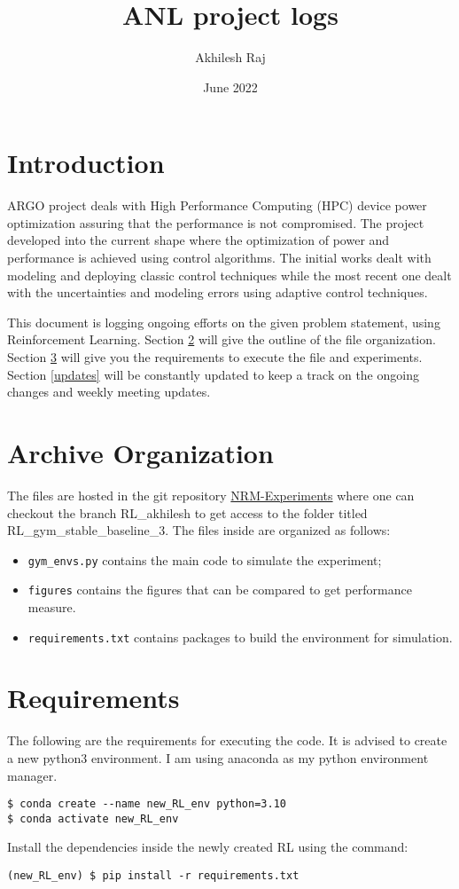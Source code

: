 \documentclass{article}
\title{ANL project logs}
\author{Akhilesh Raj}
\date{June 2022}
\begin{document}
\maketitle

\section{Introduction}
ARGO project deals with High Performance Computing (HPC) device power optimization assuring that the performance is not compromised. The project developed into the current shape where the optimization of power and performance is achieved using control algorithms. The initial works \cite{cerf2021sustaining} dealt with modeling and deploying classic control techniques while the most recent one dealt with the uncertainties and modeling errors using adaptive control techniques.

This document is logging ongoing efforts on the given problem statement, using Reinforcement Learning. Section \ref{organization} will give the outline of the file organization. Section \ref{requirements} will give you the requirements to execute the file and experiments. Section \ref{updates} will be constantly updated to keep a track on the ongoing changes and weekly meeting updates.

\section{Archive Organization} \label{organization}
The files are hosted in the git repository \href{git@github.com:anlsys/nrm-experiments.git}{NRM-Experiments} where one can checkout the branch RL\_akhilesh to get access to the folder titled 
\newline RL\_gym\_stable\_baseline\_3. The files inside are organized as follows:
\begin{itemize}
    \item \texttt{gym\_envs.py} contains the main code to simulate the experiment;
    \item \texttt{figures} contains the figures that can be compared to get performance measure.
    \item \texttt{requirements.txt} contains packages to build the environment for simulation. 
\end{itemize}


\section{Requirements} \label{requirements}
The following are the requirements for executing the code. It is advised to create a new python3 environment. I am using anaconda as my python environment manager.
\begin{verbatim}
$ conda create --name new_RL_env python=3.10
$ conda activate new_RL_env
\end{verbatim}
Install the dependencies inside the newly created RL using the command:
\begin{verbatim}
(new_RL_env) $ pip install -r requirements.txt
\end{verbatim}
\end{document}
